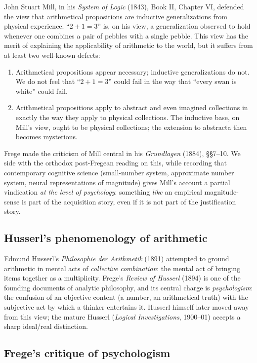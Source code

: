\documentclass[12pt]{article}
\theoremstyle{definition}
\theoremstyle{remark}
\begin{document}
John Stuart Mill, in his \emph{System of Logic} (1843), Book II, Chapter
VI, defended the view that arithmetical propositions are inductive
generalizations from physical experience. ``$2 + 1 = 3$'' is, on his view,
a generalization observed to hold whenever one combines a pair of pebbles
with a single pebble. This view has the merit of explaining the
applicability of arithmetic to the world, but it suffers from at least
two well-known defects:
\begin{enumerate}
\item Arithmetical propositions appear necessary; inductive generalizations
do not. We do not feel that ``$2+1=3$'' could fail in the way that ``every
swan is white'' could fail.
\item Arithmetical propositions apply to abstract and even imagined
collections in exactly the way they apply to physical collections. The
inductive base, on Mill's view, ought to be physical collections; the
extension to abstracta then becomes mysterious.
\end{enumerate}
Frege made the criticism of Mill central in his \emph{Grundlagen} (1884),
\S\S 7--10. We side with the orthodox post-Fregean reading on this, while
recording that contemporary cognitive science (small-number system,
approximate number system, neural representations of magnitude) gives
Mill's account a partial vindication \emph{at the level of psychology}:
something \emph{like} an empirical magnitude-sense is part of the
acquisition story, even if it is not part of the justification story.

\subsection{Husserl's phenomenology of arithmetic}

Edmund Husserl's \emph{Philosophie der Arithmetik} (1891) attempted to
ground arithmetic in mental acts of \emph{collective combination}: the
mental act of bringing items together as a multiplicity. Frege's
\emph{Review of Husserl} (1894) is one of the founding documents of
analytic philosophy, and its central charge is \emph{psychologism}: the
confusion of an objective content (a number, an arithmetical truth) with
the subjective act by which a thinker entertains it. Husserl himself
later moved away from this view; the mature Husserl (\emph{Logical
Investigations}, 1900--01) accepts a sharp ideal/real distinction.

\subsection{Frege's critique of psychologism}
\end{document}
